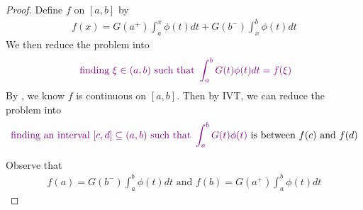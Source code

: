 \documentclass{report}
\begin{document}
\begin{proof}
Define $f$ on  $[a,b]$ by 
\begin{align*}
f(x)=G(a^+)\int_a^x \phi(t)dt+G(b^-)\int_x^b \phi(t)dt
\end{align*}
We then reduce the problem into 
\begin{align*}
\textcolor{violet}{\text{ finding }\xi \in (a,b)\text{ such that }\int_a^b G(t)\phi (t)dt=f(\xi)}
\end{align*}
By , we know $f$ is continuous on  $[a,b]$. Then by IVT, we can reduce the problem into 
\begin{align*}
\textcolor{violet}{\text{ finding an interval $[c,d]\subseteq (a,b)$ such that }\int_a^b G(t)\phi (t)}\text{ is between $f(c) $ and $f(d)$ }
\end{align*}


Observe that 
\begin{align*}
f(a)=G(b^-)\int_a^b \phi(t)dt\text{ and }f(b)=G(a^+)\int_a^b \phi(t)dt 
\end{align*}




\end{proof}
\end{document}
